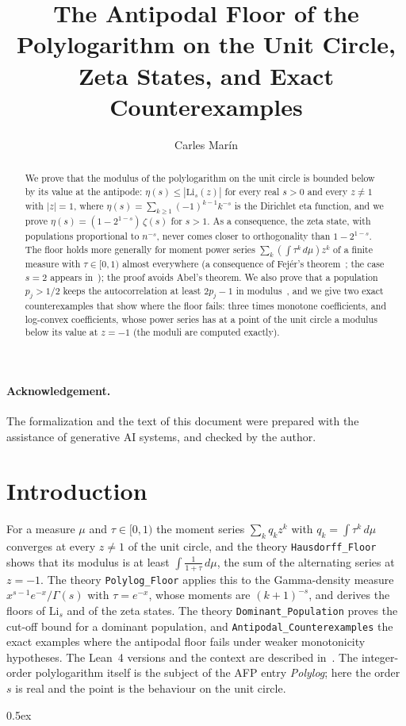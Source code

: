 \documentclass[10pt,a4paper]{article}
\begin{document}
\title{The Antipodal Floor of the Polylogarithm on the Unit Circle, Zeta States, and Exact Counterexamples}
\author{Carles Mar\'in}
\maketitle

\begin{abstract}
We prove that the modulus of the polylogarithm on the unit circle is bounded below by its value at the antipode:
$\eta(s)\le|\mathrm{Li}_s(z)|$ for every real $s>0$ and every $z\ne1$ with $|z|=1$, where $\eta(s)=\sum_{k\ge1}(-1)^{k-1}k^{-s}$
is the Dirichlet eta function, and we prove $\eta(s)=(1-2^{1-s})\,\zeta(s)$ for $s>1$. As a consequence, the
zeta state, with populations proportional to $n^{-s}$, never comes closer to orthogonality than $1-2^{1-s}$.
The floor holds more generally for moment power series $\sum_k(\int\tau^k\,d\mu)z^k$ of a finite measure with
$\tau\in[0,1)$ almost everywhere (a consequence of Fej\'er's theorem~\cite{Fejer37}; the case $s=2$ appears
in~\cite{BP21}); the proof avoids Abel's theorem. We also prove that a population $p_j>1/2$ keeps the autocorrelation
at least $2p_j-1$ in modulus~\cite{And07}, and we give two exact counterexamples that show where the floor fails: three times
monotone coefficients, and log-convex coefficients, whose power series has at a point of the unit circle a modulus below
its value at $z=-1$ (the moduli are computed exactly).
\end{abstract}

\paragraph{Acknowledgement.} The formalization and the text of this document were prepared with the
assistance of generative AI systems, and checked by the author.

\tableofcontents

\section*{Introduction}

For a measure $\mu$ and $\tau\in[0,1)$ the moment series $\sum_k q_kz^k$ with $q_k=\int\tau^k\,d\mu$ converges at every
$z\ne1$ of the unit circle, and the theory \texttt{Hausdorff\_Floor} shows that its modulus is at least
$\int\frac{1}{1+\tau}\,d\mu$, the sum of the alternating series at $z=-1$. The theory \texttt{Polylog\_Floor}
applies this to the Gamma-density measure $x^{s-1}e^{-x}/\Gamma(s)$ with $\tau=e^{-x}$, whose moments are $(k+1)^{-s}$,
and derives the floors of $\mathrm{Li}_s$ and of the zeta states. The theory \texttt{Dominant\_Population} proves the
cut-off bound for a dominant population, and \texttt{Antipodal\_Counterexamples} the exact examples where
the antipodal floor fails under weaker monotonicity hypotheses. The Lean~4 versions and the context are described
in~\cite{Marin26}. The integer-order polylogarithm itself is the subject of the AFP entry \emph{Polylog}; here the order $s$
is real and the point is the behaviour on the unit circle.

\parindent 0pt\parskip 0.5ex





\end{document}
